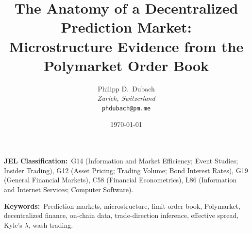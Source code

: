 \documentclass[11pt,a4paper,twocolumn]{article}
\title{The Anatomy of a Decentralized Prediction Market: \\
Microstructure Evidence from the Polymarket Order Book}
\author{Philipp D.\ Dubach \\
  \emph{Zurich, Switzerland} \\
  \texttt{phdubach@pm.me}}
\date{\today}
\begin{document}
\twocolumn[\maketitle]

\noindent\textbf{JEL Classification:}\ G14 (Information and Market
Efficiency; Event Studies; Insider Trading), G12 (Asset Pricing;
Trading Volume; Bond Interest Rates), G19 (General Financial Markets),
C58 (Financial Econometrics), L86 (Information and Internet Services;
Computer Software).

\vspace{0.5em}
\noindent\textbf{Keywords:}\ Prediction markets, microstructure,
limit order book, Polymarket, decentralized finance, on-chain data,
trade-direction inference, effective spread, Kyle's $\lambda$,
wash trading.













\clearpage


\end{document}
